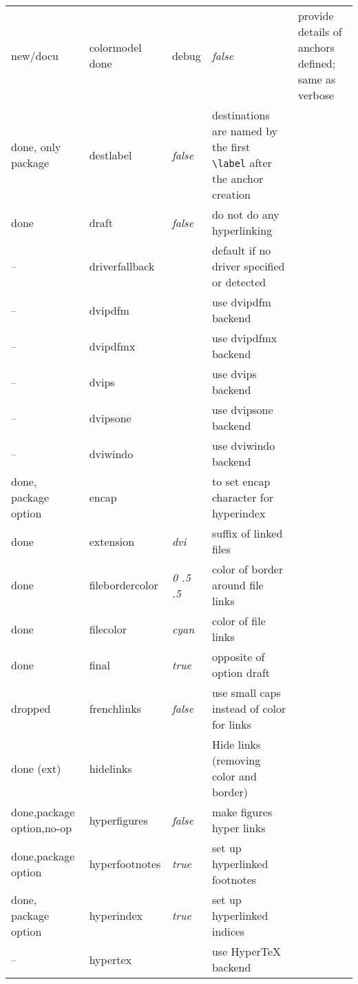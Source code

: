 \begin{longtable}{@{}l>{\ttfamily}llp{7cm}@{}}
new/docu  & colormodel
done   & debug              & \textit{false}         & provide details of anchors defined; same as verbose \\
done, only package   & destlabel          & \textit{false}         & destinations are named by the first \verb|\label| after the anchor creation \\
done   & draft              & \textit{false}         & do not do any hyperlinking \\
--     & driverfallback     &                        & default if no driver specified or detected\\
--     & dvipdfm            &                        & use \textsf{dvipdfm} backend \\
--     & dvipdfmx           &                        & use \textsf{dvipdfmx} backend \\
--     & dvips              &                        & use \textsf{dvips} backend \\
--     & dvipsone           &                        & use \textsf{dvipsone} backend \\
--     & dviwindo           &                        & use \textsf{dviwindo} backend \\
done, package option   &encap              &                        & to set encap character for hyperindex \\
done  &extension          & \textit{dvi}           & suffix of linked files \\
done &filebordercolor    & \textit{0 .5 .5}       & color of border around file links \\
done &filecolor          & \textit{cyan}          & color of file links \\
done   &final              & \textit{true}          & opposite of option draft \\
dropped &frenchlinks        & \textit{false}         & use small caps instead of color for links \\
done (ext) & hidelinks          &                        & Hide links (removing color and border) \\
done,package option,no-op& hyperfigures       & \textit{false}         & make figures hyper links \\
done,package option & hyperfootnotes     & \textit{true}          & set up hyperlinked footnotes \\
done, package option& hyperindex         & \textit{true}          & set up hyperlinked indices \\
-- & hypertex           &                        & use \textsf{Hyper\TeX} backend \\

\end{longtable}
